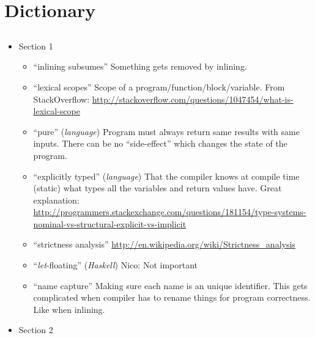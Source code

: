 
\section{Dictionary}


\subsection{\cite{GHC-paper}}
\begin{itemize}

	\item Section 1
\begin{itemize}

	\item ``inlining subsumes''
Something gets removed by inlining.

	\item ``lexical scopes''
Scope of a program/function/block/variable.
From StackOverflow:
\url{http://stackoverflow.com/questions/1047454/what-is-lexical-scope}


	\item ``pure'' (\textit{language})
Program must always return same results with same inputs. There can be no
``side-effect'' which changes the state of the program.

	\item ``explicitly typed'' (\textit{language})
That the compiler knows at compile time (static) what types all the variables
and return values have.
Great explanation: \url{http://programmers.stackexchange.com/questions/181154/type-systems-nominal-vs-structural-explicit-vs-implicit}

	\item ``strictness analysis''
\url{http://en.wikipedia.org/wiki/Strictness_analysis}

	\item ``\textit{let}-floating'' (\textit{Haskell})
Nico: Not important

	\item ``name capture''
Making sure each name is an unique identifier. This gets complicated when
compiler has to rename things for program correctness. Like when inlining.

\end{itemize}

	\item Section 2
\begin{itemize}


\end{itemize}
\end{itemize}
